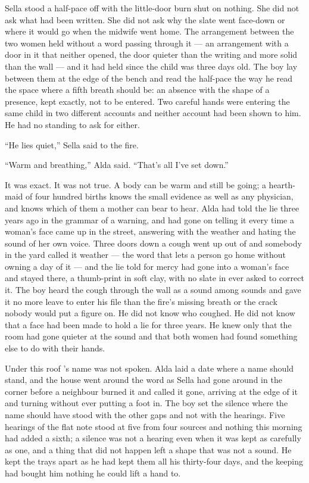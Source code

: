 Sella stood a half-pace off with the little-door burn shut on nothing. She did not ask what had been written. She did not ask why the slate went face-down or where it would go when the midwife went home. The arrangement between the two women held without a word passing through it --- an arrangement with a door in it that neither opened, the door quieter than the writing and more solid than the wall --- and it had held since the child was three days old. The boy lay between them at the edge of the bench and read the half-pace the way he read the space where a fifth breath should be: an absence with the shape of a presence, kept exactly, not to be entered. Two careful hands were entering the same child in two different accounts and neither account had been shown to him. He had no standing to ask for either.

“He lies quiet,” Sella said to the fire.

“Warm and breathing,” Alda said. “That's all I've set down.”

It was exact. It was not true. A body can be warm and still be going; a hearth-maid of four hundred births knows the small evidence as well as any physician, and knows which of them a mother can bear to hear. Alda had told the lie three years ago in the grammar of a warning, and had gone on telling it every time a woman's face came up in the street, answering with the weather and hating the sound of her own voice. Three doors down a cough went up out of  and somebody in the yard called it weather --- the word that lets a person go home without owning a day of it --- and the lie told for mercy had gone into a woman's face and stayed there, a thumb-print in soft clay, with no slate in  ever asked to correct it. The boy heard the cough through the wall as a sound among sounds and gave it no more leave to enter his file than the fire's missing breath or the crack nobody would put a figure on. He did not know who coughed. He did not know that a face had been made to hold a lie for three years. He knew only that the room had gone quieter at the sound and that both women had found something else to do with their hands.

Under this roof 's name was not spoken. Alda laid a date where a name should stand, and the house went around the word as Sella had gone around  in the corner before a neighbour burned it and called it gone, arriving at the edge of it and turning without ever putting a foot in. The boy set the silence where the name should have stood with the other gaps and not with the hearings. Five hearings of the flat note stood at five from four sources and nothing this morning had added a sixth; a silence was not a hearing even when it was kept as carefully as one, and a thing that did not happen left a shape that was not a sound. He kept the trays apart as he had kept them all his thirty-four days, and the keeping had bought him nothing he could lift a hand to.

